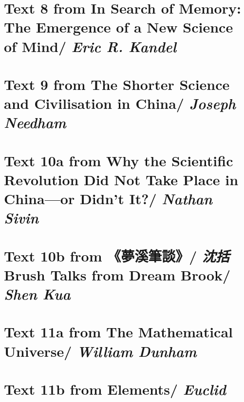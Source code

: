 \documentclass{article}
\begin{document}
\section{Text 8 from In Search of Memory: The Emergence of a New Science of Mind/ \textit{Eric R. Kandel}}
\newpage
\section{Text 9 from The Shorter Science and Civilisation in China/ \textit{Joseph Needham}}
\newpage
\section{Text 10a from Why the Scientific Revolution Did Not Take Place in China—or Didn’t It?/ \textit{Nathan Sivin}}
\newpage
\section{Text 10b from 《夢溪筆談》/ \textit{沈括} Brush Talks from Dream Brook/ \textit{Shen Kua}}
\newpage
\section{Text 11a from The Mathematical Universe/ \textit{William Dunham}}
\newpage
\section{Text 11b from Elements/ \textit{Euclid}}
\end{document}
